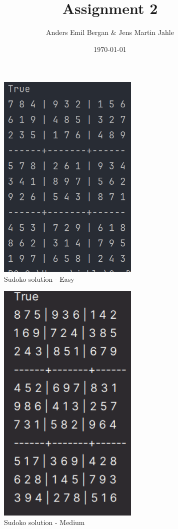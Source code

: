 \documentclass[11pt]{article}
\begin{document}
\title{Assignment 2}
\author{Anders Emil Bergan \& Jens Martin Jahle}
\date{\today}

\maketitle
{}

\begin{figure}[h!]
    \centering
    \includegraphics[width=0.6\textwidth]{images/sudoko_easy}
    \caption{Sudoko solution - Easy}
    \label{fig:easy}
\end{figure}

\begin{figure}[h!]
    \centering
    \includegraphics[width=0.6\textwidth]{images/sudoko_medium}
    \caption{Sudoko solution - Medium}
    \label{fig:medium}
\end{figure}
\end{document}
